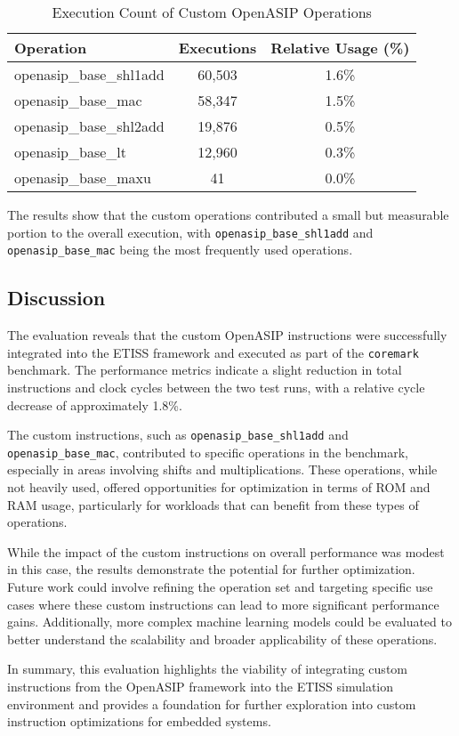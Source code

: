 \begin{table}[h!]
    \centering
    \begin{tabular}{|l|c|c|}
        \hline
        \textbf{Operation} & \textbf{Executions} & \textbf{Relative Usage (\%)} \\
        \hline
        openasip\_base\_shl1add & 60,503 & 1.6\% \\
        openasip\_base\_mac     & 58,347 & 1.5\% \\
        openasip\_base\_shl2add & 19,876 & 0.5\% \\
        openasip\_base\_lt      & 12,960 & 0.3\% \\
        openasip\_base\_maxu    & 41     & 0.0\% \\
        \hline
    \end{tabular}
    \caption{Execution Count of Custom OpenASIP Operations}
\end{table}

The results show that the custom operations contributed a small but measurable portion to the overall execution, with \texttt{openasip\_base\_shl1add} and \texttt{openasip\_base\_mac} being the most frequently used operations.

\subsection{Discussion}

The evaluation reveals that the custom OpenASIP instructions were successfully integrated into the ETISS framework and executed as part of the \texttt{coremark} benchmark. The performance metrics indicate a slight reduction in total instructions and clock cycles between the two test runs, with a relative cycle decrease of approximately 1.8\%.

The custom instructions, such as \texttt{openasip\_base\_shl1add} and \texttt{openasip\_base\_mac}, contributed to specific operations in the benchmark, especially in areas involving shifts and multiplications. These operations, while not heavily used, offered opportunities for optimization in terms of ROM and RAM usage, particularly for workloads that can benefit from these types of operations.

While the impact of the custom instructions on overall performance was modest in this case, the results demonstrate the potential for further optimization. Future work could involve refining the operation set and targeting specific use cases where these custom instructions can lead to more significant performance gains. Additionally, more complex machine learning models could be evaluated to better understand the scalability and broader applicability of these operations.

In summary, this evaluation highlights the viability of integrating custom instructions from the OpenASIP framework into the ETISS simulation environment and provides a foundation for further exploration into custom instruction optimizations for embedded systems.
